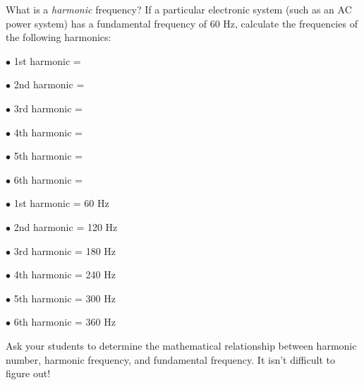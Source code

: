

What is a {\it harmonic} frequency?  If a particular electronic system (such as an AC power system) has a fundamental frequency of 60 Hz, calculate the frequencies of the following harmonics:

\medskip
\item{$\bullet$} 1st harmonic = 
\item{$\bullet$} 2nd harmonic = 
\item{$\bullet$} 3rd harmonic = 
\item{$\bullet$} 4th harmonic = 
\item{$\bullet$} 5th harmonic = 
\item{$\bullet$} 6th harmonic = 
\medskip







\medskip
\item{$\bullet$} 1st harmonic = 60 Hz
\item{$\bullet$} 2nd harmonic = 120 Hz
\item{$\bullet$} 3rd harmonic = 180 Hz
\item{$\bullet$} 4th harmonic = 240 Hz
\item{$\bullet$} 5th harmonic = 300 Hz
\item{$\bullet$} 6th harmonic = 360 Hz
\medskip







Ask your students to determine the mathematical relationship between harmonic number, harmonic frequency, and fundamental frequency.  It isn't difficult to figure out!




